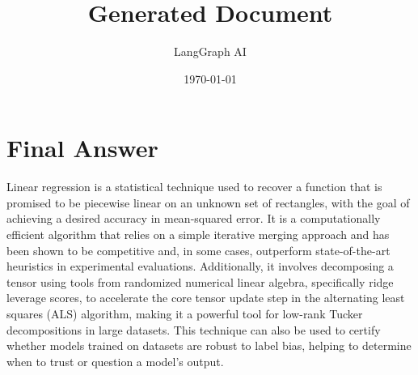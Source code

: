 \documentclass{article}%
\title{Generated Document}%
\author{LangGraph AI}%
\date{\today}%
\begin{document}
%
\normalsize%
\maketitle%
\section{Final Answer}%
\label{sec:FinalAnswer}%
Linear regression is a statistical technique used to recover a function that is promised to be piecewise linear on an unknown set of rectangles, with the goal of achieving a desired accuracy in mean{-}squared error. It is a computationally efficient algorithm that relies on a simple iterative merging approach and has been shown to be competitive and, in some cases, outperform state{-}of{-}the{-}art heuristics in experimental evaluations. Additionally, it involves decomposing a tensor using tools from randomized numerical linear algebra, specifically ridge leverage scores, to accelerate the core tensor update step in the alternating least squares (ALS) algorithm, making it a powerful tool for low{-}rank Tucker decompositions in large datasets. This technique can also be used to certify whether models trained on datasets are robust to label bias, helping to determine when to trust or question a model's output.

%
\end{document}
